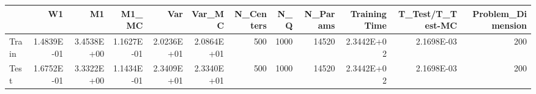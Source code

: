 \begin{tabular}{lrrrrrrrrrrr}
\toprule
{} &         W1 &         M1 &      M1\_MC &        Var &     Var\_MC &  N\_Centers &   N\_Q &  N\_Params &  Training Time &  T\_Test/T\_Test-MC &  Problem\_Dimension \\
\midrule
Train & 1.4839E-01 & 3.4538E+00 & 1.1627E-01 & 2.0236E+01 & 2.0864E+01 &        500 &  1000 &     14520 &     2.3442E+02 &        2.1698E-03 &                200 \\
Test  & 1.6752E-01 & 3.3322E+00 & 1.1434E-01 & 2.3409E+01 & 2.3340E+01 &        500 &  1000 &     14520 &     2.3442E+02 &        2.1698E-03 &                200 \\
\bottomrule
\end{tabular}
